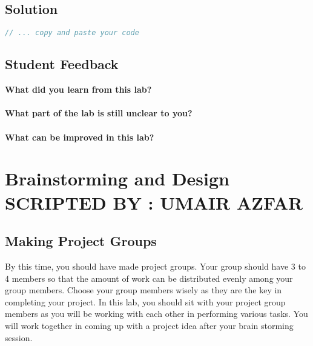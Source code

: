 \documentclass[11pt,fleqn]{book} %
\begin{document}
\newpage
\section{Solution}
\begin{lstlisting}[language=C++]
  // ... copy and paste your code
\end{lstlisting}

\newpage
\section{Student Feedback}
\textbf{What did you learn from this lab?}\\
\noindent\fbox{\parbox{\textwidth}{
  }
}\\
\textbf{What part of the lab is still unclear to you?}\\
\noindent\fbox{\parbox{\textwidth}{
  }
}\\
\textbf{What can be improved in this lab?}\\ 
\noindent\fbox{\parbox{\textwidth}{
  }
}

\newpage
{} %
\chapter{Brainstorming and Design \hspace{40mm} {\textsc{\small SCRIPTED BY : UMAIR AZFAR}}}

\section{Making Project Groups}
By this time, you should have made project groups. Your group should have 3 to 4 members so that the amount of work can be distributed evenly among your group members. Choose your group members wisely as they are the key in completing your project.
In this lab, you should sit with your project group members as you will be working with each other in performing various tasks. You will work together in coming up with a project idea after your brain storming session.
\end{document}
